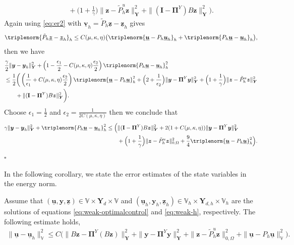 \documentclass[smallextended]{svjour3}
\renewenvironment{proof}{\noindent{\it Proof.}}{\hfill$\square$}
\numberwithin{equation}{section}
\numberwithin{figure}{section}
\numberwithin{table}{section}
\newcommand\bI{\mathbf{I}}
\newcommand\bPi{\boldsymbol{\Pi}}
\newcommand{\tP}{\tilde{P}}
\newcommand\buu{\underline{\boldsymbol{u}}}
\newcommand\buv{\underline{\boldsymbol{v}}}
\newcommand\buz{\underline{\boldsymbol{z}}}
\newcommand\by{\boldsymbol{y}}
\newcommand\bz{\boldsymbol{z}}
\newcommand{\bYd}{\boldsymbol{Y}_d}
\newcommand{\bY}{\boldsymbol{Y}}
\newcommand{\bbV}{\mathbb{V}}
\begin{document}
\begin{proof}
\begin{align*}
        & \qquad + \Big( 1+\frac{1}{ \gamma} \Big) \|   \bz - \tP_h^u \bz\|_{\bY}^2 + \|  (\bI - \bPi^Y) B \bz\|_{\bY}^2 \Big).
    \end{align*}
	Again using \eqref{eq:er2} with $\buv_h = \tP_h \buz - \buz_h$ gives
	\begin{align*}
		\triplenorm{  \tP_h \buz - \buz_h }_h  \le C(\mu, \kappa, \eta) \big( \triplenorm{ \buu - P_h \buu_h}_h +  \triplenorm{ P_h \buu - \buu_h}_h \big),
	\end{align*}
    then we have
    \begin{align*}
         & \frac{\gamma}{2} \| \by - \by_h \|_{\bY}^2 + \left( 1 - \frac{\epsilon_1}{2}- C(\mu, \kappa, \eta) \frac{\epsilon_2}{2} \right) \triplenorm{ P_h \buu - \buu_h }_h^2 \\
        & \le \frac{1}{2} \bigg( \left(\frac{1}{\epsilon_1} + C(\mu, \kappa, \eta)\frac{\epsilon_2}{2}\right) \triplenorm{ \buu - P_h \buu}_h^2  + \Big( 2+\frac{1}{\epsilon_2} \Big) \| \by - \bPi^Y \by\|_{\bY}^2 + \Big( 1+\frac{1}{ \gamma} \Big) \|  \bz - \tP_h^u \bz\|_{\bY}^2 \\
        & \qquad + \|  (\bI - \bPi^Y) B \bz\|_{\bY}^2 \bigg).
    \end{align*}
	Choose $\epsilon_1 =\frac{1}{2}$ and $\epsilon_2 = \frac{1}{2C(\mu, \kappa, \eta)}$ then we conclude that
	\begin{align*}
		\gamma \| \by - \by_h \|_{\bY}^2 +  \triplenorm{ P_h \buu - \buu_h}_h^2 \le \Big( & \| (\bI - \bPi^Y) B \bz \|_{\bY}^2 + 2(1+C(\mu, \kappa, \eta))\| \by - \bPi^Y \by \|_{\bY}^2  \\
        & + \Big( 1+\frac{1}{ \gamma} \Big) \| \bz - \tP_h^u \bz\|_{0, \Omega}^2 + \frac{9}{4} \triplenorm{ \buu - P_h \buu }_h^2 \Big).
	\end{align*}
\end{proof}


In the following corollary, we state the error estimates of the state variables in the energy norm.
\begin{corollary} \label{cor:abs-state}
	Assume that $(\buu,\by,\buz) \in \bbV \times \bYd \times \bbV$ and $(\buu_h, \by_h, \buz_h) \in \bbV_h \times \bY_{d,h} \times \bbV_h$ are the solutions of equations \eqref{eq:weak-optimalcontrol} and \eqref{eq:weak-h}, respectively. The following estimate holds,
	\begin{align*}
		\| \buu - \buu_h \|_{\bbV}^2 \le C \Big(  \| B \bz - \bPi^Y (B \bz) \|_{\bY}^2 + \| \by - \bPi^Y \by \|_{\bY}^2 
		+ \| \bz - \tP_h^u \bz \|_{0, \Omega}^2 + \| \buu - P_h \buu \|_{\bbV}^2 \Big).
	\end{align*}
\end{corollary}
\end{document}
